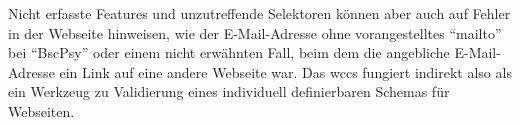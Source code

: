     Nicht erfasste Features und unzutreffende Selektoren können
    aber auch auf Fehler in der Webseite hinweisen,
    wie der E-Mail-Adresse ohne vorangestelltes "`mailto"'
    bei "`BscPsy"' oder einem nicht erwähnten Fall,
    beim dem die angebliche E-Mail-Adresse ein Link auf eine andere Webseite war.
    Das \gls{wccs} fungiert indirekt also als ein Werkzeug
    zu Validierung eines individuell definierbaren Schemas für Webseiten.